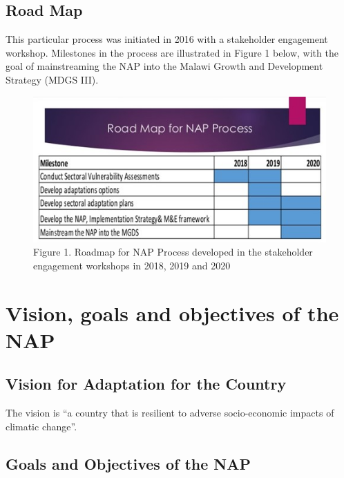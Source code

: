 \documentclass[
]{book}
\begin{document}
\hypertarget{road-map}{%
\section{Road Map}\label{road-map}}

This particular process was initiated in 2016 with a stakeholder engagement workshop. Milestones in the process are illustrated in Figure 1 below, with the goal of mainstreaming the NAP into the Malawi Growth and Development Strategy (MDGS III).

\begin{figure}
\centering
\includegraphics{images/roadmap.jpg}
\caption{Figure 1. Roadmap for NAP Process developed in the stakeholder engagement workshops in 2018, 2019 and 2020}
\end{figure}

\hypertarget{vision-goals-and-objectives-of-the-nap}{%
\chapter{Vision, goals and objectives of the NAP}\label{vision-goals-and-objectives-of-the-nap}}

\hypertarget{vision-for-adaptation-for-the-country}{%
\section{Vision for Adaptation for the Country}\label{vision-for-adaptation-for-the-country}}

The vision is ``a country that is resilient to adverse socio-economic impacts of climatic change''.

\hypertarget{goals-and-objectives-of-the-nap}{%
\section{Goals and Objectives of the NAP}\label{goals-and-objectives-of-the-nap}}
\end{document}
